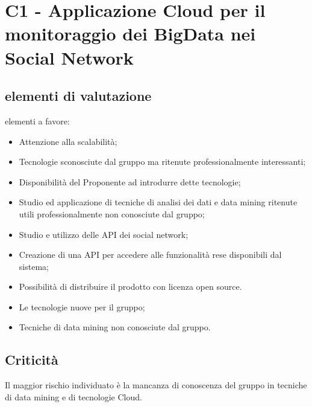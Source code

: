 \section{C1 - Applicazione Cloud per il monitoraggio dei BigData nei Social Network}{
	\subsection{elementi di valutazione}{
		elementi a favore:
		\begin{itemize}
			\item Attenzione alla scalabilità;
			\item Tecnologie sconosciute dal gruppo ma ritenute professionalmente interessanti;
			\item Disponibilità del Proponente ad introdurre dette tecnologie;
			\item Studio ed applicazione di tecniche di analisi dei dati e data mining ritenute utili professionalmente non conosciute dal gruppo;
			\item Studio e utilizzo delle API dei social network;
			\item Creazione di una API per accedere alle funzionalità rese disponibili dal sistema;
			\item Possibilità di distribuire il prodotto con licenza open source.
		\end{itemize}
		
		\begin{itemize}
			\item Le tecnologie nuove per il gruppo;
			\item Tecniche di data mining non conosciute dal gruppo.
		\end{itemize}
	}
	\subsection{Criticità}{
		Il maggior rischio individuato è la mancanza di conoscenza del gruppo in tecniche di data mining e di tecnologie Cloud.
	}
}
